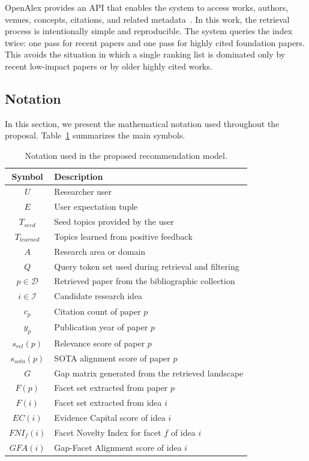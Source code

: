 \documentclass[preprint,12pt]{elsarticle}
\begin{document}
OpenAlex provides an API that enables the system to access works, authors, venues, concepts, citations, and related metadata~\cite{priem2022openalex}. In this work, the retrieval process is intentionally simple and reproducible. The system queries the index twice: one pass for recent papers and one pass for highly cited foundation papers. This avoids the situation in which a single ranking list is dominated only by recent low-impact papers or by older highly cited works.

\subsection{Notation}
\label{subsec:notation}

In this section, we present the mathematical notation used throughout the proposal. Table~\ref{tab:notation} summarizes the main symbols.

\begin{table}[t]
  \centering
  \caption{Notation used in the proposed recommendation model.}
  \label{tab:notation}
  \begin{tabular}{@{}cl@{}}
    \toprule
    \textbf{Symbol} & \textbf{Description} \\
    \midrule
    $U$ & Researcher user \\
    $E$ & User expectation tuple \\
    $T_{seed}$ & Seed topics provided by the user \\
    $T_{learned}$ & Topics learned from positive feedback \\
    $A$ & Research area or domain \\
    $Q$ & Query token set used during retrieval and filtering \\
    $p \in \mathcal{D}$ & Retrieved paper from the bibliographic collection \\
    $i \in \mathcal{I}$ & Candidate research idea \\
    $c_p$ & Citation count of paper $p$ \\
    $y_p$ & Publication year of paper $p$ \\
    $s_{rel}(p)$ & Relevance score of paper $p$ \\
    $s_{sota}(p)$ & SOTA alignment score of paper $p$ \\
    $G$ & Gap matrix generated from the retrieved landscape \\
    $F(p)$ & Facet set extracted from paper $p$ \\
    $F(i)$ & Facet set extracted from idea $i$ \\
    $EC(i)$ & Evidence Capital score of idea $i$ \\
    $FNI_f(i)$ & Facet Novelty Index for facet $f$ of idea $i$ \\
    $GFA(i)$ & Gap-Facet Alignment score of idea $i$ \\
    \bottomrule
  \end{tabular}
\end{table}
\end{document}
